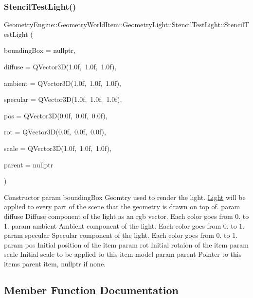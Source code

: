 \subsubsection{\texorpdfstring{StencilTestLight()}{StencilTestLight()}}
{\footnotesize\ttfamily Geometry\+Engine\+::\+Geometry\+World\+Item\+::\+Geometry\+Light\+::\+Stencil\+Test\+Light\+::\+Stencil\+Test\+Light (\begin{DoxyParamCaption}\item[{\mbox{\hyperlink{class_geometry_engine_1_1_geometry_world_item_1_1_geometry_item_1_1_geometry_item}{Geometry\+Item\+::\+Geometry\+Item}} $\ast$}]{bounding\+Box = {\ttfamily nullptr},  }\item[{const Q\+Vector3D \&}]{diffuse = {\ttfamily QVector3D(1.0f,~1.0f,~1.0f)},  }\item[{const Q\+Vector3D \&}]{ambient = {\ttfamily QVector3D(1.0f,~1.0f,~1.0f)},  }\item[{const Q\+Vector3D \&}]{specular = {\ttfamily QVector3D(1.0f,~1.0f,~1.0f)},  }\item[{const Q\+Vector3D \&}]{pos = {\ttfamily QVector3D(0.0f,~0.0f,~0.0f)},  }\item[{const Q\+Vector3D \&}]{rot = {\ttfamily QVector3D(0.0f,~0.0f,~0.0f)},  }\item[{const Q\+Vector3D \&}]{scale = {\ttfamily QVector3D(1.0f,~1.0f,~1.0f)},  }\item[{\mbox{\hyperlink{class_geometry_engine_1_1_geometry_world_item_1_1_world_item}{World\+Item}} $\ast$}]{parent = {\ttfamily nullptr} }\end{DoxyParamCaption})}

Constructor param bounding\+Box Geomtry used to render the light. \mbox{\hyperlink{class_geometry_engine_1_1_geometry_world_item_1_1_geometry_light_1_1_light}{Light}} will be applied to every part of the scene that the geometry is drawn on top of. param diffuse Diffuse component of the light as an rgb vector. Each color goes from 0. to 1. param ambient Ambient component of the light. Each color goes from 0. to 1. param specular Specular component of the light. Each color goes from 0. to 1. param pos Initial position of the item param rot Initial rotaion of the item param scale Initial scale to be applied to this item model param parent Pointer to this items parent item, nullptr if none. 

\subsection{Member Function Documentation}
\mbox{\label{class_geometry_engine_1_1_geometry_world_item_1_1_geometry_light_1_1_stencil_test_light_aa1d9d4bf4f47e6e55dbb1706a7e28697}} 
